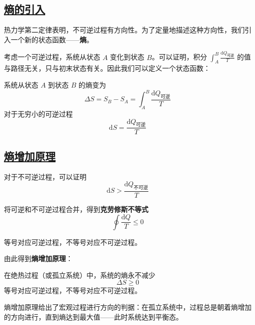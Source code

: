 \subsection{\protect\hyperlink{:}{熵的引入}}

热力学第二定律表明，不可逆过程有方向性。为了定量地描述这种方向性，我们引入一个新的状态函数——\textbf{熵}。

考虑一个可逆过程，系统从状态 $A$ 变化到状态 $B$。可以证明，积分 $\int_A^B \frac{\mathrm{d}Q_{\text{可逆}}}{T}$ 的值与路径无关，只与初末状态有关。因此我们可以定义一个状态函数：

\begin{definition}[熵]
    系统从状态 $A$ 到状态 $B$ 的熵变为
    \begin{equation}
        \Delta S = S_B - S_A = \int_A^B \frac{\mathrm{d}Q_{\text{可逆}}}{T}
    \end{equation}
    对于无穷小的可逆过程
    \begin{equation}
        \mathrm{d}S = \frac{\mathrm{d}Q_{\text{可逆}}}{T}
    \end{equation}
\end{definition}

\subsection{\protect\hyperlink{:}{熵增加原理}}

对于不可逆过程，可以证明
\begin{equation}
    \mathrm{d}S > \frac{\mathrm{d}Q_{\text{不可逆}}}{T}
\end{equation}

将可逆和不可逆过程合并，得到\textbf{克劳修斯不等式}
\begin{equation}
    \oint \frac{\mathrm{d}Q}{T} \leqslant 0
\end{equation}

等号对应可逆过程，不等号对应不可逆过程。

由此得到\textbf{熵增加原理}：

\begin{theorem}[熵增加原理]
    在绝热过程（或孤立系统）中，系统的熵永不减少
    \begin{equation}
        \Delta S \geqslant 0
    \end{equation}
    等号对应可逆过程，不等号对应不可逆过程。
\end{theorem}

熵增加原理给出了宏观过程进行方向的判据：在孤立系统中，过程总是朝着熵增加的方向进行，直到熵达到最大值——此时系统达到平衡态。

